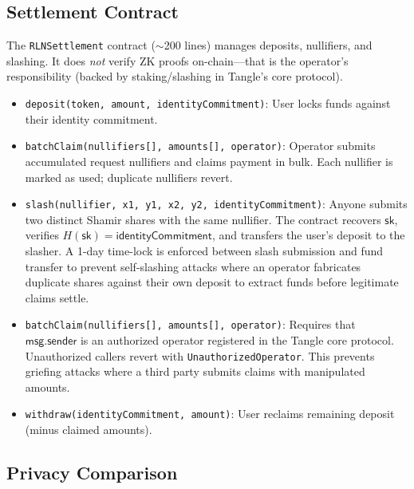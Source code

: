 \documentclass[11pt,a4paper]{article}
\theoremstyle{definition}
\begin{document}
\subsection{Settlement Contract}

The \texttt{RLNSettlement} contract ($\sim$200 lines) manages deposits, nullifiers, and slashing. It does \emph{not} verify ZK proofs on-chain---that is the operator's responsibility (backed by staking/slashing in Tangle's core protocol).

\begin{itemize}[nosep]
  \item \texttt{deposit(token, amount, identityCommitment)}: User locks funds against their identity commitment.
  \item \texttt{batchClaim(nullifiers[], amounts[], operator)}: Operator submits accumulated request nullifiers and claims payment in bulk. Each nullifier is marked as used; duplicate nullifiers revert.
  \item \texttt{slash(nullifier, x1, y1, x2, y2, identityCommitment)}: Anyone submits two distinct Shamir shares with the same nullifier. The contract recovers $\mathsf{sk}$, verifies $H(\mathsf{sk}) = \mathsf{identityCommitment}$, and transfers the user's deposit to the slasher. A 1-day time-lock is enforced between slash submission and fund transfer to prevent self-slashing attacks where an operator fabricates duplicate shares against their own deposit to extract funds before legitimate claims settle.
  \item \texttt{batchClaim(nullifiers[], amounts[], operator)}: Requires that $\mathsf{msg.sender}$ is an authorized operator registered in the Tangle core protocol. Unauthorized callers revert with \texttt{UnauthorizedOperator}. This prevents griefing attacks where a third party submits claims with manipulated amounts.
  \item \texttt{withdraw(identityCommitment, amount)}: User reclaims remaining deposit (minus claimed amounts).
\end{itemize}

\subsection{Privacy Comparison}
\end{document}
